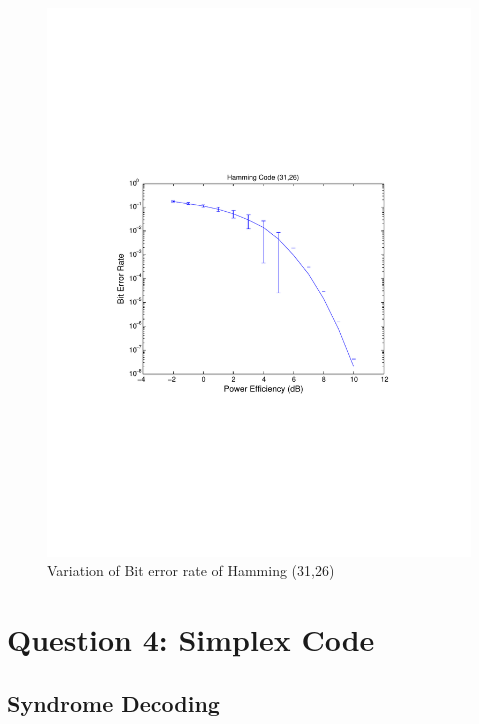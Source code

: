 \documentclass[11pt, english]{article}
\begin{document}
\begin{figure}
    \centering
    \includegraphics[width=.8\textwidth]{hamming_31_26_ber.pdf}
    \caption{Variation of Bit error rate of Hamming (31,26)}
    \label{b31}
\end{figure}


\section{Question 4: Simplex Code}
\subsection{Syndrome Decoding}
\end{document}
